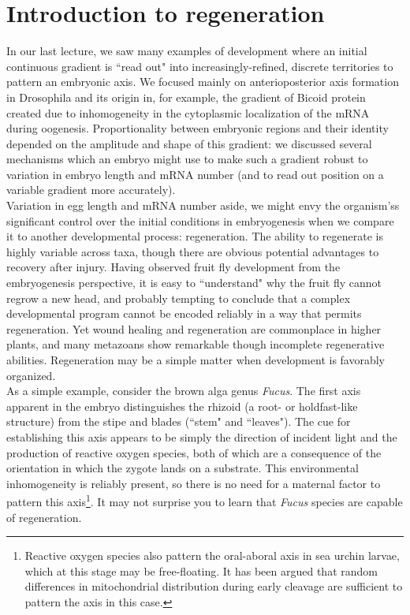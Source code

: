 \documentclass{article}
\begin{document}
\large

\section*{Introduction to regeneration}

In our last lecture, we saw many examples of development where an initial continuous gradient is ``read out" into increasingly-refined, discrete territories to pattern an embryonic axis. We focused mainly on anterioposterior axis formation in Drosophila and its origin in, for example, the gradient of Bicoid protein created due to inhomogeneity in the cytoplasmic localization of the mRNA during oogenesis. Proportionality between embryonic regions and their identity depended on the amplitude and shape of this gradient: we discussed several mechanisms which an embryo might use to make such a gradient robust to variation in embryo length and mRNA number (and to read out position on a variable gradient more accurately).\\

Variation in egg length and mRNA number aside, we might envy the organism'ss significant control over the initial conditions in embryogenesis when we compare it to another developmental process: regeneration. The ability to regenerate is highly variable across taxa, though there are obvious potential advantages to recovery after injury. Having observed fruit fly development from the embryogenesis perspective, it is easy to ``understand" why the fruit fly cannot regrow a new head, and probably tempting to conclude that a complex developmental program cannot be encoded reliably in a way that permits regeneration. Yet wound healing and regeneration are commonplace in higher plants, and many metazoans show remarkable though incomplete regenerative abilities. Regeneration may be a simple matter when development is favorably organized.\\

As a simple example, consider the brown alga genus \textit{Fucus}. The first axis apparent in the embryo distinguishes the rhizoid (a root- or holdfast-like structure) from the stipe and blades (``stem" and ``leaves"). The cue for establishing this axis appears to be simply the direction of incident light and the production of reactive oxygen species, both of which are a consequence of the orientation in which the zygote lands on a substrate. This environmental inhomogeneity is reliably present, so there is no need for a maternal factor to pattern this axis\footnote{Reactive oxygen species also pattern the oral-aboral axis in sea urchin larvae, which at this stage may be free-floating. It has been argued that random differences in mitochondrial distribution during early cleavage are sufficient to pattern the axis in this case.}. It may not surprise you to learn that \textit{Fucus} species are capable of regeneration.
\end{document}
